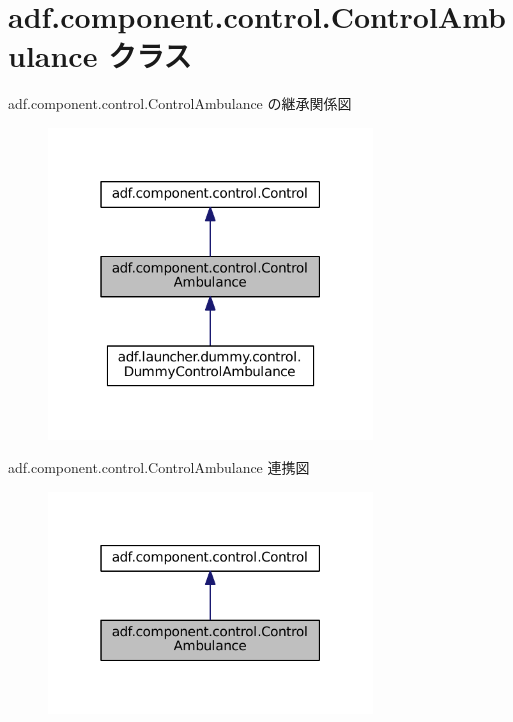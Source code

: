 \hypertarget{classadf_1_1component_1_1control_1_1ControlAmbulance}{}\section{adf.\+component.\+control.\+Control\+Ambulance クラス}
\label{classadf_1_1component_1_1control_1_1ControlAmbulance}


adf.\+component.\+control.\+Control\+Ambulance の継承関係図
\nopagebreak
\begin{figure}[H]
\begin{center}
\leavevmode
\includegraphics[width=244pt]{classadf_1_1component_1_1control_1_1ControlAmbulance__inherit__graph}
\end{center}
\end{figure}


adf.\+component.\+control.\+Control\+Ambulance 連携図
\nopagebreak
\begin{figure}[H]
\begin{center}
\leavevmode
\includegraphics[width=244pt]{classadf_1_1component_1_1control_1_1ControlAmbulance__coll__graph}
\end{center}
\end{figure}
